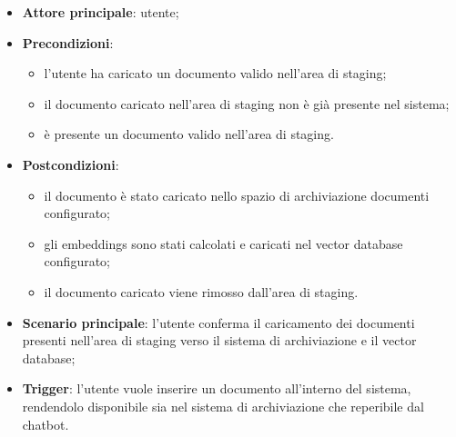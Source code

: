 \documentclass[10pt, a4paper]{article}
\begin{document}
    \begin{itemize}
        \item \textbf{Attore principale}: utente;
        \item \textbf{Precondizioni}:
            \begin{itemize}
                \item l’utente ha caricato un documento valido nell’area di staging;
                \item il documento caricato nell'area di staging non è già presente nel sistema;
                \item è presente un documento valido nell’area di staging.
            \end{itemize}
        \item \textbf{Postcondizioni}:
        \begin{itemize}
            \item il documento è stato caricato nello spazio di archiviazione documenti configurato;
            \item gli embeddings sono stati calcolati e caricati nel vector database configurato;
            \item il documento caricato viene rimosso dall’area di staging.
        \end{itemize}
        \item \textbf{Scenario principale}: l’utente conferma il caricamento dei documenti presenti nell’area di staging verso il sistema di archiviazione e il vector database;
        \item \textbf{Trigger}: l’utente vuole inserire un documento all’interno del sistema, rendendolo disponibile sia nel sistema di archiviazione che reperibile dal chatbot.
    \end{itemize}

\end{document}
